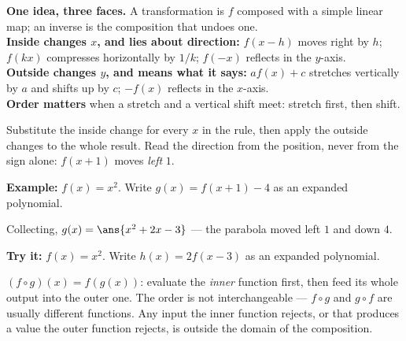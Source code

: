\documentclass[12pt]{article}
\begin{document}

\begin{formulabox}
\textbf{One idea, three faces.} A transformation is $f$ composed with a simple
linear map; an inverse is the composition that undoes one.\\[3pt]
\textbf{Inside changes $x$, and lies about direction:} $f(x-h)$ moves right by
$h$; $f(kx)$ compresses horizontally by $1/k$; $f(-x)$ reflects in the
$y$-axis.\\[3pt]
\textbf{Outside changes $y$, and means what it says:} $af(x)+c$ stretches
vertically by $a$ and shifts up by $c$; $-f(x)$ reflects in the $x$-axis.\\[3pt]
\textbf{Order matters} when a stretch and a vertical shift meet: stretch first,
then shift.
\end{formulabox}


\begin{formulabox}
Substitute the inside change for every $x$ in the rule, then apply the outside
changes to the whole result. Read the direction from the position, never from
the sign alone: $f(x+1)$ moves \emph{left} $1$.
\end{formulabox}

\begin{examplebox}
\textbf{Example:} $f(x)=x^2$. Write $g(x)=f(x+1)-4$ as an expanded polynomial.

Collecting, $g(x)=\ans{x^2+2x-3}$ --- the parabola moved left $1$ and down $4$.
\end{examplebox}

\begin{tryitbox}
\textbf{Try it:} $f(x)=x^2$. Write $h(x)=2f(x-3)$ as an expanded
polynomial.\\[2pt]
\end{tryitbox}


\begin{formulabox}
$(f\circ g)(x)=f(g(x))$: evaluate the \emph{inner} function first, then feed its
whole output into the outer one. The order is not interchangeable ---
$f\circ g$ and $g\circ f$ are usually different functions. Any input the inner
function rejects, or that produces a value the outer function rejects, is
outside the domain of the composition.
\end{formulabox}
\end{document}
